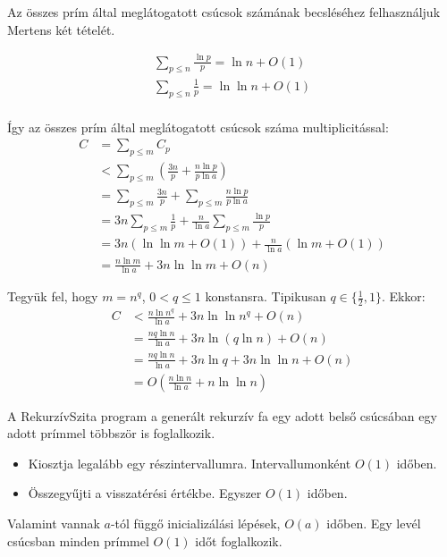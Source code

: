 \documentclass[12pt]{report}
\begin{document}
Az összes prím által meglátogatott csúcsok számának becsléséhez felhasználjuk Mertens két tételét.\cite{mertens}

\begin{align*}
\sum_{p \le n} \frac{\ln{p}}{p} = \ln{n} + O(1) \\
\sum_{p \le n} \frac{1}{p} = \ln{\ln{n}} + O(1) \\
\end{align*}

Így az összes prím által meglátogatott csúcsok száma multiplicitással:
\begin{align*}
C &= \sum_{p \le m} C_p \\
&< \sum_{p \le m} \left( \frac{3n}{p} + \frac{n \ln{p}}{p \ln{a}} \right) \\
&= \sum_{p \le m} \frac{3n}{p} + \sum_{p \le m} \frac{n \ln{p}}{p \ln{a}} \\
&= 3n \sum_{p \le m} \frac{1}{p} + \frac{n}{\ln{a}} \sum_{p \le m} \frac{\ln{p}}{p} \\
&= 3n (\ln{\ln{m}}+O(1)) + \frac{n}{\ln{a}} (\ln{m}+O(1)) \\
&= \frac{n \ln{m}}{\ln{a}} + 3n \ln{\ln{m}} + O(n)
\end{align*}

Tegyük fel, hogy $m = n^q$, $ 0 < q \le 1$ konstansra.
Tipikusan $q \in \{\frac{1}{2}, 1\}$.
Ekkor:
\begin{align*}
C &< \frac{n \ln{n^q}}{\ln{a}} + 3n \ln{\ln{n^q}} + O(n) \\
&= \frac{n q \ln{n}}{\ln{a}} + 3n \ln{(q\ln{n})} + O(n) \\
&= \frac{n q \ln{n}}{\ln{a}} + 3n \ln{q} + 3n \ln{\ln{n}} + O(n) \\
&= O \left( \frac{n \ln{n}}{\ln{a}} + n \ln{\ln{n}} \right)
\end{align*}

A RekurzívSzita program a generált rekurzív fa egy adott belső csúcsában
egy adott prímmel többször is foglalkozik.
\begin{itemize}
\item Kiosztja legalább egy részintervallumra. Intervallumonként $O(1)$ időben.
\item Összegyűjti a visszatérési értékbe. Egyszer $O(1)$ időben.
\end{itemize}
Valamint vannak $a$-tól függő inicializálási lépések, $O(a)$ időben.
Egy levél csúcsban minden prímmel $O(1)$ időt foglalkozik.
\end{document}
